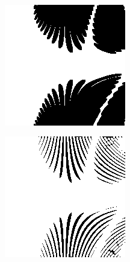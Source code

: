\documentclass[a4paper,12pt,notitlepage]{article}
\begin{document}
\begin{figure}[H]
\begin{subfigure}[b]{0.4\textwidth}
					\caption{}
				\end{subfigure}\\
				\begin{subfigure}[b]{0.4\textwidth}
					\centering
					\includegraphics[width=\textwidth]{chris/image8}
					\caption{}
				\end{subfigure}
				\begin{subfigure}[b]{0.4\textwidth}
					\centering
					\includegraphics[width=\textwidth]{chris/image9}

\end{subfigure}
\end{figure}
\end{document}

